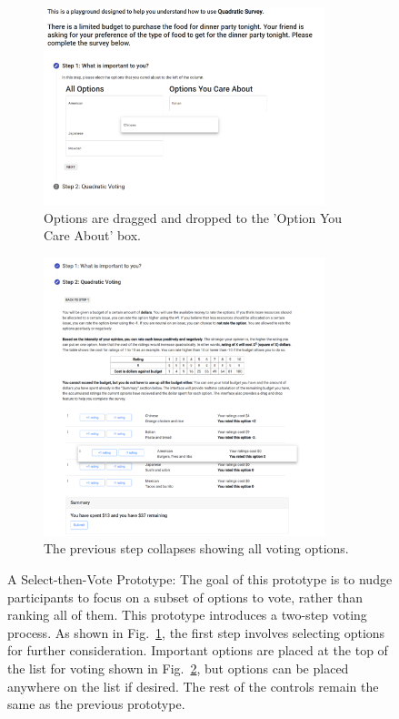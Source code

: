 \begin{figure}[h]
    \centering
    \begin{subfigure}[b]{0.47\textwidth}
        \centering
        \includegraphics[width=0.9\textwidth]{content/image/prototypes/3.1_selecting.png}
        \caption{Options are dragged and dropped to the 'Option You Care About' box.}
        \label{fig:qv_select_selection}
    \end{subfigure}
    \hfill
    \begin{subfigure}[b]{0.47\textwidth}
        \centering
        \includegraphics[width=0.9\textwidth]{content/image/prototypes/3.2_selecting_2.png}
        \caption{The previous step collapses showing all voting options.}
        \label{fig:qv_select_vote}
    \end{subfigure}
    \caption{A Select-then-Vote Prototype: The goal of this prototype is to nudge participants to focus on a subset of options to vote, rather than ranking all of them. This prototype introduces a two-step voting process. As shown in Fig.~\ref{fig:qv_select_selection}, the first step involves selecting options for further consideration. Important options are placed at the top of the list for voting shown in Fig.~\ref{fig:qv_select_vote}, but options can be placed anywhere on the list if desired. The rest of the controls remain the same as the previous prototype.}
    \label{fig:qv_select}
\end{figure}

